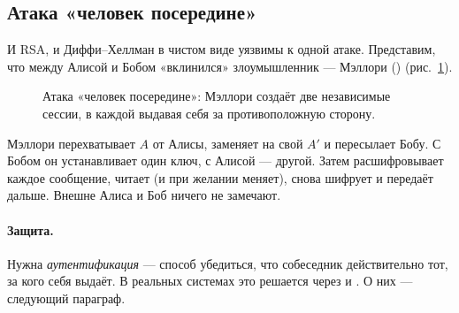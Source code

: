 \subsection{Атака «человек посередине»}

И RSA, и Диффи--Хеллман в чистом виде уязвимы к одной атаке. Представим, что между Алисой и Бобом «вклинился» злоумышленник --- Мэллори () (рис.~\ref{fig:p3-4}).

\begin{figure}[H]
\centering
{}
\caption{Атака «человек посередине»: Мэллори создаёт две независимые сессии, в каждой выдавая себя за противоположную сторону.}
\label{fig:p3-4}
\end{figure}

Мэллори перехватывает $A$ от Алисы, заменяет на свой $A'$ и пересылает Бобу. С Бобом он устанавливает один ключ, с Алисой --- другой. Затем расшифровывает каждое сообщение, читает (и при желании меняет), снова шифрует и передаёт дальше. Внешне Алиса и Боб ничего не замечают.

\paragraph*{Защита.} Нужна \emph{аутентификация} --- способ убедиться, что собеседник действительно тот, за кого себя выдаёт. В реальных системах это решается через  и . О них --- следующий параграф.

